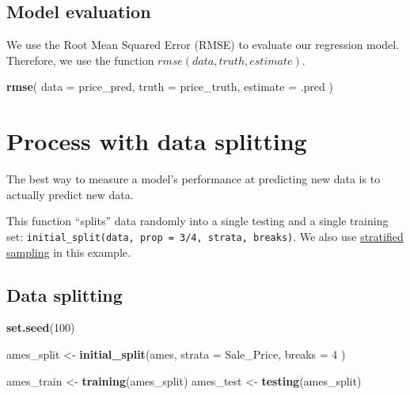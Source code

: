 \documentclass[
]{book}
\newenvironment{Shaded}{\begin{snugshade}}{\end{snugshade}}
\newcommand{\DataTypeTok}[1]{\textcolor[rgb]{0.13,0.29,0.53}{#1}}
\newcommand{\DecValTok}[1]{\textcolor[rgb]{0.00,0.00,0.81}{#1}}
\newcommand{\KeywordTok}[1]{\textcolor[rgb]{0.13,0.29,0.53}{\textbf{#1}}}
\newcommand{\NormalTok}[1]{#1}
\newcommand{\StringTok}[1]{\textcolor[rgb]{0.31,0.60,0.02}{#1}}
\begin{document}
\hypertarget{model-evaluation}{%
\section{Model evaluation}\label{model-evaluation}}

We use the Root Mean Squared Error (RMSE) to evaluate our regression model. Therefore, we use the function \(rmse(data, truth, estimate)\).

\begin{Shaded}
\begin{Highlighting}[]
\KeywordTok{rmse}\NormalTok{(}
  \DataTypeTok{data =}\NormalTok{ price\_pred,}
  \DataTypeTok{truth =}\NormalTok{ price\_truth,}
  \DataTypeTok{estimate =}\NormalTok{ .pred}
\NormalTok{)}
\end{Highlighting}
\end{Shaded}

\hypertarget{process-with-data-splitting}{%
\chapter{Process with data splitting}\label{process-with-data-splitting}}

The best way to measure a model's performance at predicting new data is to actually predict new data.

This function ``splits'' data randomly into a single testing and a single training set: \texttt{initial\_split(data,\ prop\ =\ 3/4,\ strata,\ breaks)}. We also use \href{https://en.wikipedia.org/wiki/Stratified_sampling}{stratified sampling} in this example.

\hypertarget{data-splitting-1}{%
\section{Data splitting}\label{data-splitting-1}}

\begin{Shaded}
\begin{Highlighting}[]
\KeywordTok{set.seed}\NormalTok{(}\DecValTok{100}\NormalTok{)}

\NormalTok{ames\_split \textless{}{-}}\StringTok{ }\KeywordTok{initial\_split}\NormalTok{(ames,}
  \DataTypeTok{strata =}\NormalTok{ Sale\_Price,}
  \DataTypeTok{breaks =} \DecValTok{4}
\NormalTok{)}

\NormalTok{ames\_train \textless{}{-}}\StringTok{ }\KeywordTok{training}\NormalTok{(ames\_split)}
\NormalTok{ames\_test \textless{}{-}}\StringTok{ }\KeywordTok{testing}\NormalTok{(ames\_split)}
\end{Highlighting}
\end{Shaded}
\end{document}
